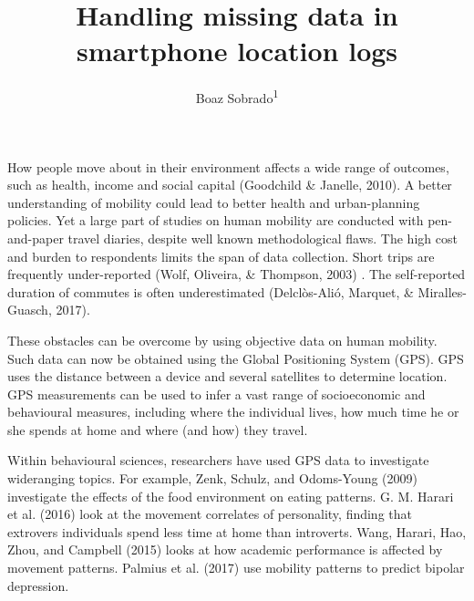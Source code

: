 \documentclass[english,man]{apa6}
\title{Handling missing data in smartphone location logs}
\author{Boaz Sobrado\textsuperscript{1}}
\affiliation{
    \vspace{0.5cm}
          \textsuperscript{1} Utrecht University  }
\theoremstyle{definition}
\theoremstyle{definition}
\theoremstyle{definition}
\theoremstyle{remark}
\begin{document}
\maketitle

\setcounter{secnumdepth}{0}



How people move about in their environment affects a wide range of
outcomes, such as health, income and social capital (Goodchild \&
Janelle, 2010). A better understanding of mobility could lead to better
health and urban-planning policies. Yet a large part of studies on human
mobility are conducted with pen-and-paper travel diaries, despite well
known methodological flaws. The high cost and burden to respondents
limits the span of data collection. Short trips are frequently
under-reported (Wolf, Oliveira, \& Thompson, 2003) . The self-reported
duration of commutes is often underestimated (Delclòs-Alió, Marquet, \&
Miralles-Guasch, 2017).

These obstacles can be overcome by using objective data on human
mobility. Such data can now be obtained using the Global Positioning
System (GPS). GPS uses the distance between a device and several
satellites to determine location. GPS measurements can be used to infer
a vast range of socioeconomic and behavioural measures, including where
the individual lives, how much time he or she spends at home and where
(and how) they travel.

Within behavioural sciences, researchers have used GPS data to
investigate wideranging topics. For example, Zenk, Schulz, and
Odoms-Young (2009) investigate the effects of the food environment on
eating patterns. G. M. Harari et al. (2016) look at the movement
correlates of personality, finding that extrovers individuals spend less
time at home than introverts. Wang, Harari, Hao, Zhou, and Campbell
(2015) looks at how academic performance is affected by movement
patterns. Palmius et al. (2017) use mobility patterns to predict bipolar
depression.
\end{document}
